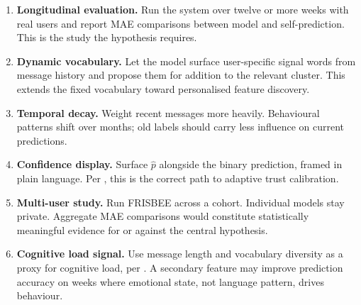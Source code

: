 \documentclass[11pt, a4paper]{report}
\begin{document}
\begin{enumerate}
  \item \textbf{Longitudinal evaluation.} Run the system over twelve or
    more weeks with real users and report MAE comparisons between model
    and self-prediction. This is the study the hypothesis requires.

  \item \textbf{Dynamic vocabulary.} Let the model surface user-specific
    signal words from message history and propose them for addition to
    the relevant cluster. This extends the fixed vocabulary toward
    personalised feature discovery.

  \item \textbf{Temporal decay.} Weight recent messages more heavily.
    Behavioural patterns shift over months; old labels should carry less
    influence on current predictions.

  \item \textbf{Confidence display.} Surface $\hat{p}$ alongside the
    binary prediction, framed in plain language. Per \citet{hengstler2016},
    this is the correct path to adaptive trust calibration.

  \item \textbf{Multi-user study.} Run FRISBEE across a cohort. Individual
    models stay private. Aggregate MAE comparisons would constitute
    statistically meaningful evidence for or against the central hypothesis.

  \item \textbf{Cognitive load signal.} Use message length and vocabulary
    diversity as a proxy for cognitive load, per \citet{sweller1988}.
    A secondary feature may improve prediction accuracy on weeks where
    emotional state, not language pattern, drives behaviour.
\end{enumerate}




\end{document}
